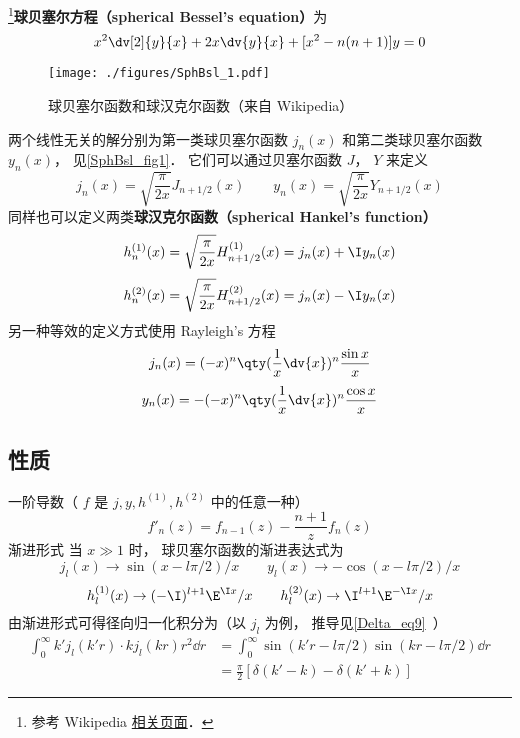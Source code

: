 

\footnote{参考 Wikipedia \href{https://en.wikipedia.org/wiki/Bessel_function}{相关页面}．}\textbf{球贝塞尔方程（spherical Bessel's equation）}为
\begin{equation}
x^2 \dv[2]{y}{x} + 2x \dv{y}{x} + [x^2 - n(n + 1)]y = 0
\end{equation}
\begin{figure}[ht]
\centering
\texttt{[image: ./figures/SphBsl\_1.pdf]}
\caption{球贝塞尔函数和球汉克尔函数（来自 Wikipedia）} \label{SphBsl_fig1}
\end{figure}
两个线性无关的解分别为第一类球贝塞尔函数 $j_n(x)$ 和第二类球贝塞尔函数 $y_n(x)$， 见\autoref{SphBsl_fig1}． 它们可以通过贝塞尔函数 $J$， $Y$ 来定义
\begin{equation}
j_n(x) = \sqrt{\frac{\pi}{2x}} J_{n+1/2}(x)
\qquad
y_n(x) = \sqrt{\frac{\pi}{2x}} Y_{n+1/2}(x)
\end{equation}
同样也可以定义两类\textbf{球汉克尔函数（spherical Hankel's function）}
\begin{equation}
h_n^{(1)}(x) = \sqrt {\frac{\pi }{2x}} H_{n+1/2}^{(1)}(x) = j_n(x) + \I y_n(x)
\end{equation}
\begin{equation}
h_n^{(2)}(x) = \sqrt{\frac{\pi }{2x}} H_{n+1/2}^{(2)}(x) = j_n(x) - \I y_n(x)
\end{equation}
另一种等效的定义方式使用 Rayleigh's 方程
\begin{equation}
j_n(x) = (-x)^n \qty(\frac{1}{x} \dv{x})^n \frac{\sin x}{x}
\end{equation}
\begin{equation}
y_n(x) = -(-x)^n \qty(\frac{1}{x} \dv{x})^n \frac{\cos x}{x}
\end{equation}

\subsection{性质}
一阶导数（ $f$ 是 $j, y, h^{(1)}, h^{(2)}$ 中的任意一种）
\begin{equation}
f'_n(z) = f_{n-1}(z) - \frac{n+1}{z} f_n(z)
\end{equation}
渐进形式
当 $x \gg 1$ 时， 球贝塞尔函数的渐进表达式为
\begin{equation}
j_l(x) \to \sin(x - l\pi /2)/x
\qquad
y_l(x) \to  - \cos(x - l\pi /2)/x
\end{equation}
\begin{equation}
h_l^{(1)}(x) \to ( -\I)^{l+1} \E^{\I x}/x
\qquad
h_l^{(2)}(x) \to \I^{l + 1} \E^{-\I x}/x
\end{equation}
由渐进形式可得径向归一化积分为（以 $j_l$ 为例， 推导见\autoref{Delta_eq9}~）
\begin{equation}
\begin{aligned}
\int_0^\infty k'j_l(k'r) \cdot kj_l(kr) r^2 \dd{r} &= \int_0^\infty \sin(k'r - l\pi/2)\sin(kr - l\pi/2) \dd{r}\\
& = \frac{\pi}{2}[\delta(k'-k) - \delta(k'+k)]
\end{aligned}
\end{equation}

